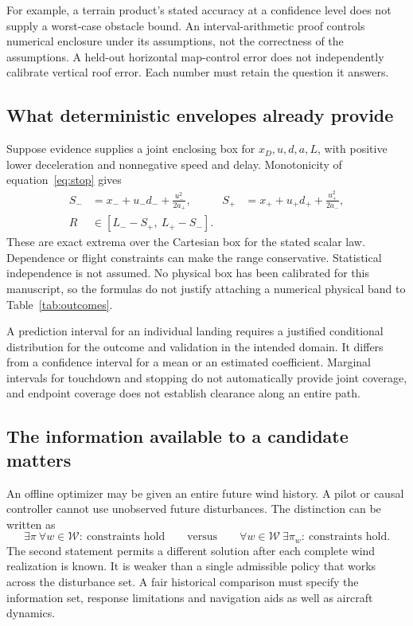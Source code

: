 For example, a terrain product's stated accuracy at a confidence level does not supply a worst-case obstacle bound. An interval-arithmetic proof controls numerical enclosure under its assumptions, not the correctness of the assumptions. A held-out horizontal map-control error does not independently calibrate vertical roof error. Each number must retain the question it answers.

\subsection{What deterministic envelopes already provide}
Suppose evidence supplies a joint enclosing box for $x_D,u,d,a,L$, with positive lower deceleration and nonnegative speed and delay. Monotonicity of equation~\eqref{eq:stop} gives
\begin{align}
S_-&=x_-+u_-d_-+\frac{u_-^2}{2a_+},&
S_+&=x_++u_+d_++\frac{u_+^2}{2a_-},\\
R&\in[L_- -S_+,\ L_+-S_-].
\end{align}
These are exact extrema over the Cartesian box for the stated scalar law. Dependence or flight constraints can make the range conservative. Statistical independence is not assumed. No physical box has been calibrated for this manuscript, so the formulas do not justify attaching a numerical physical band to Table~\ref{tab:outcomes}.

A prediction interval for an individual landing requires a justified conditional distribution for the outcome and validation in the intended domain. It differs from a confidence interval for a mean or an estimated coefficient. Marginal intervals for touchdown and stopping do not automatically provide joint coverage, and endpoint coverage does not establish clearance along an entire path.

\subsection{The information available to a candidate matters}
An offline optimizer may be given an entire future wind history. A pilot or causal controller cannot use unobserved future disturbances. The distinction can be written as
\begin{equation}
\exists\pi\ \forall w\in\mathcal W:\ \text{constraints hold}
\qquad\text{versus}\qquad
\forall w\in\mathcal W\ \exists\pi_w:\ \text{constraints hold}.
\end{equation}
The second statement permits a different solution after each complete wind realization is known. It is weaker than a single admissible policy that works across the disturbance set. A fair historical comparison must specify the information set, response limitations and navigation aids as well as aircraft dynamics.

